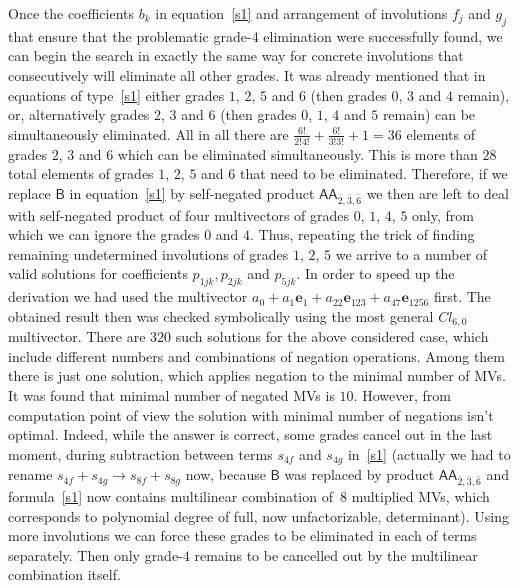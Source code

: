 \documentclass{birkjour}
\newcommand{\e}[1]{\mathbf{e}_{#1}} %
\def\m#1{\mathsf{#1}} %
\begin{document}
Once the coefficients $b_k$ in equation~\eqref{s1} and arrangement
of involutions $f_j$ and $g_j$ that ensure that the problematic
grade-$4$ elimination were successfully found, we can begin
the search in exactly the same way for concrete involutions that
consecutively will eliminate all other grades. It was already
mentioned that in equations of type~\eqref{s1} either grades $1$,
$2$, $5$ and $6$ (then grades $0$, $3$ and $4$ remain), or,
alternatively grades $2$, $3$ and $6$ (then grades $0$, $1$, $4$
and $5$ remain) can be simultaneously eliminated. All in all there
are $\frac{6!}{2!4!}+\frac{6!}{3!3!} +1=36$ elements of grades
$2$, $3$ and $6$ which can be eliminated simultaneously. This is
more than $28$ total elements of grades $1$, $2$, $5$ and $6$ that need to be eliminated. Therefore, if we replace $\m{B}$ in
equation~\eqref{s1} by self-negated product $\m{A}\m{A}_{{\bar
2},{\bar 3},{\bar 6}}$ we then are left to deal with self-negated
product of four multivectors of grades $0$, $1$, $4$, $5$ only,
from which we can ignore  the grades $0$ and $4$. Thus, repeating
the trick of finding remaining undetermined involutions of grades
$1$, $2$, $5$ we arrive to a number of valid solutions for
coefficients $p_{1jk},p_{2jk}$ and $p_{5jk}$. In order to speed up
the derivation we had used the multivector $ a_{0}+a_{1}
\e{1}+a_{22} \e{123}+a_{47} \e{1256}$ first. The obtained result
then was checked symbolically using the most general $Cl_{6,0}$
multivector. There are $320$ such solutions for the above
considered case, which include different numbers and combinations
of negation operations. Among them there is just one solution,
which applies negation to the minimal number of MVs. It was found
that  minimal number of negated MVs is $10$. However, from
computation point of view the solution with minimal number of
negations isn't optimal. Indeed, while the answer is correct, some
grades cancel out in the last moment, during subtraction between 
terms $s_{4f}$ and $s_{4g}$ in~\eqref{s1} (actually we
had to rename $s_{4f}+s_{4g}\rightarrow s_{8f}+s_{8g}$ now, because $\m{B}$
was replaced by product $\m{A}\m{A}_{{\bar 2},{\bar 3},{\bar 6}}$
and formula~\eqref{s1} now contains multilinear combination of~8 multiplied MVs, which corresponds to polynomial degree of full, now unfactorizable, determinant). Using more involutions we can force these
grades to be eliminated in each of terms separately. Then only
grade-$4$ remains to be cancelled out by the multilinear
combination itself.
\end{document}
